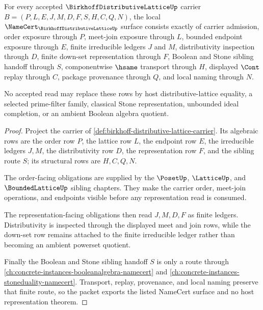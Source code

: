 \begin{theorem}
\label{thm:birkhoff-distributive-lattice-namecert-obligations}
For every accepted $\BirkhoffDistributiveLatticeUp$ carrier $B=(P,L,E,J,M,D,F,S,H,C,Q,N)$, the local $\NameCert_{\BirkhoffDistributiveLatticeUp}$ surface consists exactly of carrier admission, order exposure through $P$, meet-join exposure through $L$, bounded endpoint exposure through $E$, finite irreducible ledgers $J$ and $M$, distributivity inspection through $D$, finite down-set representation through $F$, Boolean and Stone sibling handoff through $S$, componentwise $\hsame$ transport through $H$, displayed $\Cont$ replay through $C$, package provenance through $Q$, and local naming through $N$.

No accepted read may replace these rows by host distributive-lattice equality, a selected prime-filter family, classical Stone representation, unbounded ideal completion, or an ambient Boolean algebra quotient.
\end{theorem}
\begin{proof}
Project the carrier of \autoref{def:birkhoff-distributive-lattice-carrier}. Its algebraic rows are the order row $P$, the lattice row $L$, the endpoint row $E$, the irreducible ledgers $J,M$, the distributivity row $D$, the representation row $F$, and the sibling route $S$; its structural rows are $H,C,Q,N$.

The order-facing obligations are supplied by the $\PosetUp$, $\LatticeUp$, and $\BoundedLatticeUp$ sibling chapters. They make the carrier order, meet-join operations, and endpoints visible before any representation read is consumed.

The representation-facing obligations then read $J,M,D,F$ as finite ledgers. Distributivity is inspected through the displayed meet and join rows, while the down-set row remains attached to the finite irreducible ledger rather than becoming an ambient powerset quotient.

Finally the Boolean and Stone sibling handoff $S$ is only a route through \autoref{ch:concrete-instances-booleanalgebra-namecert} and \autoref{ch:concrete-instances-stoneduality-namecert}. Transport, replay, provenance, and local naming preserve that finite route, so the packet exports the listed NameCert surface and no host representation theorem.
\end{proof}

